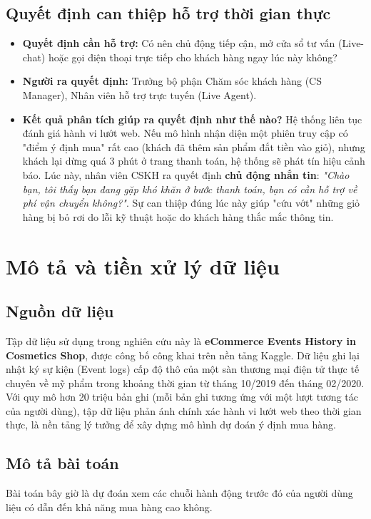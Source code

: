 \documentclass[a4paper,11pt]{article}
\begin{document}
\subsection{Quyết định can thiệp hỗ trợ thời gian thực}
\begin{itemize}[itemsep=4pt, leftmargin=*]
    \item \textbf{Quyết định cần hỗ trợ:} Có nên chủ động tiếp cận, mở cửa sổ tư vấn (Live-chat) hoặc gọi điện thoại trực tiếp cho khách hàng ngay lúc này không?
    \item \textbf{Người ra quyết định:} Trưởng bộ phận Chăm sóc khách hàng (CS Manager), Nhân viên hỗ trợ trực tuyến (Live Agent).
    \item \textbf{Kết quả phân tích giúp ra quyết định như thế nào?} Hệ thống liên tục đánh giá hành vi lướt web. Nếu mô hình nhận diện một phiên truy cập có "điểm ý định mua" rất cao (khách đã thêm sản phẩm đắt tiền vào giỏ), nhưng khách lại dừng quá 3 phút ở trang thanh toán, hệ thống sẽ phát tín hiệu cảnh báo. Lúc này, nhân viên CSKH ra quyết định \textbf{chủ động nhắn tin}: \textit{"Chào bạn, tôi thấy bạn đang gặp khó khăn ở bước thanh toán, bạn có cần hỗ trợ về phí vận chuyển không?"}. Sự can thiệp đúng lúc này giúp "cứu vớt" những giỏ hàng bị bỏ rơi do lỗi kỹ thuật hoặc do khách hàng thắc mắc thông tin.
\end{itemize}

\section{Mô tả và tiền xử lý dữ liệu}
\subsection{Nguồn dữ liệu}
Tập dữ liệu sử dụng trong nghiên cứu này là \textbf{eCommerce Events History in Cosmetics Shop}, được công bố công khai trên nền tảng Kaggle. Dữ liệu ghi lại nhật ký sự kiện (Event logs) cấp độ thô của một sàn thương mại điện tử thực tế chuyên về mỹ phẩm trong khoảng thời gian từ tháng 10/2019 đến tháng 02/2020. 
Với quy mô hơn 20 triệu bản ghi (mỗi bản ghi tương ứng với một lượt tương tác của người dùng), tập dữ liệu phản ánh chính xác hành vi lướt web theo thời gian thực, là nền tảng lý tưởng để xây dựng mô hình dự đoán ý định mua hàng.
\subsection{Mô tả bài toán}
Bài toán bây giờ là dự đoán xem các chuỗi hành động trước đó của người dùng liệu có dẫn đến khả năng mua hàng cao không. 
\end{document}
